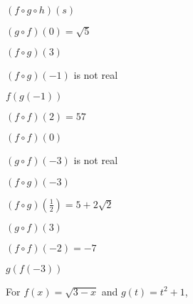 \documentclass{ximera}
\begin{document}
\begin{question}
$(f\circ g \circ h)(s)$ 

\begin{solution}
$(g\circ f)(0) = \sqrt{5}$
\end{solution}

\end{question}

\begin{question}
$(f \circ g)(3)$
\begin{solution}
$(f\circ g)(-1)$ is not real
\end{solution}

\end{question}

\begin{question}
$f(g(-1))$
\begin{solution}
$(f \circ f)(2) = 57$








\end{solution}

\end{question}

\begin{question}
$(f \circ f)(0)$

\begin{solution}
$(g\circ f)(-3)$ is not real
\end{solution}

\end{question}

\begin{question}
$(f \circ g)(-3)$
\begin{solution}
$(f\circ g)\left(\frac{1}{2}\right) = 5+2\sqrt{2}$
\end{solution}

\end{question}

\begin{question}
$(g \circ f)(3)$
\begin{solution}
$(f \circ f)(-2) = -7$


\end{solution}

\end{question}

\begin{question}
$g(f(-3))$


\begin{solution}
For $f(x) = \sqrt{3-x}$ and $g(t) = t^2+1$,



\end{solution}

\end{question}
\end{document}
